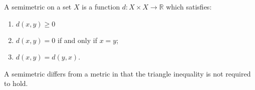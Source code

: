 \documentclass[12pt]{article}
\newcommand{\R}{\mathbb{R}}
\begin{document}
A semimetric on a set $X$ is a function $d\colon X\times X\to \R$ which satisfies:
\begin{enumerate}
\item $d(x,y)\geq 0$
\item $d(x,y)= 0$ if and only if $x=y$;
\item $d(x,y) = d(y,x)$.
\end{enumerate}

A semimetric differs from a metric in that the triangle inequality is not required to hold.
\end{document}

